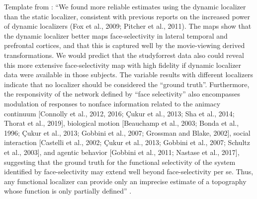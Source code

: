 Template from \citet{jiahui2020predicting}: ``We found more reliable estimates
using the dynamic localizer than the static localizer, consistent with previous
reports on the increased power of dynamic localizers (Fox et al., 2009; Pitcher
et al., 2011).
%
The maps show that the dynamic localizer better maps face-selectivity in lateral
temporal and prefrontal cortices, and that this is captured well by the
movie-viewing derived transformations.
%
We would predict that the studyforrest data also could reveal this more
extensive face-selectivity map with high fidelity if dynamic localizer data were
available in those subjects.
%
The variable results with different localizers indicate that no localizer should
be considered the “ground truth”.
%
Furthermore, the responsivity of the network defined by “face selectivity” also
encompasses modulation of responses to nonface information related to the
animacy continuum [Connolly et al., 2012, 2016; Çukur et al., 2013; Sha et al.,
2014; Thorat et al., 2019], biological motion [Beauchamp et al., 2003; Bonda et
al., 1996; Çukur et al., 2013; Gobbini et al., 2007; Grossman and Blake, 2002],
social interaction [Castelli et al., 2002; Çukur et al., 2013; Gobbini et al.,
2007; Schultz et al., 2003], and agentic behavior [Gobbini et al., 2011; Nastase
et al., 2017], suggesting that the ground truth for the functional selectivity
of the system identified by face-selectivity may extend well beyond
face-selectivity per se.
%
Thus, any functional localizer can provide only an imprecise estimate of a
topography whose function is only partially defined''
\citep{jiahui2020predicting}.

